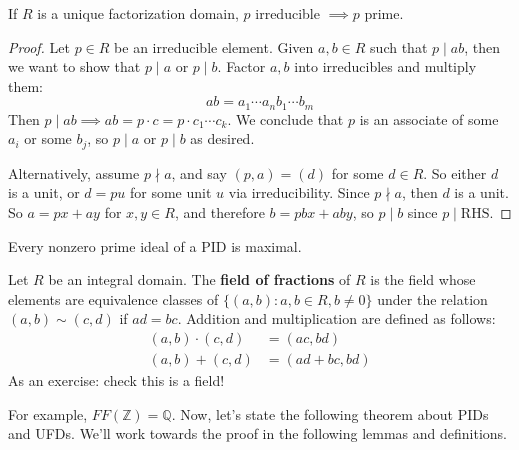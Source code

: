 \documentclass{article}
\theoremstyle{plain}
\newcommand{\Q}{\mathbb{Q}}
\newcommand{\Z}{\mathbb{Z}}
\begin{document}
\begin{lemma}{}{}
If $R$ is a unique factorization domain, $p$ irreducible $\implies p$ prime.
\end{lemma}
\begin{proof}
	Let $p \in R$ be an irreducible element. Given $a,b \in R$ such that $p\mid ab$, then we want to show that $p\mid a$ or $p\mid b$. Factor $a,b$ into irreducibles and multiply them:
	$$ab = a_1\cdots a_nb_1\cdots b_m$$
	Then $p\mid ab \implies ab = p\cdot c = p\cdot c_1\cdots c_k$. We conclude that $p$ is an associate of some $a_i$ or some $b_j$, so $p\mid a$ or $p\mid b$ as desired.
	
	Alternatively, assume $p\nmid a$, and say $(p,a) = (d)$ for some $d \in R$. So either $d$ is a unit, or $d = pu$ for some unit $u$ via irreducibility. Since $p\nmid a$, then $d$ is a unit. So $a = px + ay$ for $x,y \in R$, and therefore $b = pbx + aby$, so $p\mid b$ since $p\mid \text{RHS}$.
\end{proof}
\begin{corollary}{}{}
Every nonzero prime ideal of a PID is maximal. 	
\end{corollary}


\begin{definition}{}{}
Let $R$ be an integral domain. The \textbf{field of fractions} of $R$ is the field whose elements are equivalence classes of $\{ (a,b) : a,b \in R, b \ne 0 \}$ under the relation $(a,b) \sim (c,d)$ if $ad=bc$. Addition and multiplication are defined as follows:
	\begin{align*}
	(a,b) \cdot (c,d) &= (ac,bd) \\	
	(a,b) + (c,d) &= (ad+bc,bd)
	\end{align*}
	As an exercise: check this is a field!
\end{definition}
For example, $FF(\Z) = \Q$. Now, let's state the following theorem about PIDs and UFDs. We'll work towards the proof in the following lemmas and definitions.
\end{document}
